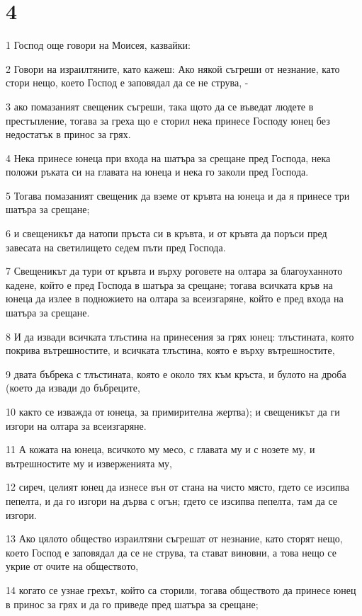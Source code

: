 \chapter{4}

\par 1 Господ още говори на Моисея, казвайки:
\par 2 Говори на израилтяните, като кажеш: Ако някой съгреши от незнание, като стори нещо, което Господ е заповядал да се не струва, -
\par 3 ако помазаният свещеник съгреши, така щото да се въведат людете в престъпление, тогава за греха що е сторил нека принесе Господу юнец без недостатък в принос за грях.
\par 4 Нека принесе юнеца при входа на шатъра за срещане пред Господа, нека положи ръката си на главата на юнеца и нека го заколи пред Господа.
\par 5 Тогава помазаният свещеник да вземе от кръвта на юнеца и да я принесе три шатъра за срещане;
\par 6 и свещеникът да натопи пръста си в кръвта, и от кръвта да поръси пред завесата на светилището седем пъти пред Господа.
\par 7 Свещеникът да тури от кръвта и върху роговете на олтара за благоуханното кадене, който е пред Господа в шатъра за срещане; тогава всичката кръв на юнеца да излее в подножието на олтара за всеизгаряне, който е пред входа на шатъра за срещане.
\par 8 И да извади всичката тлъстина на принесения за грях юнец: тлъстината, която покрива вътрешностите, и всичката тлъстина, която е върху вътрешностите,
\par 9 двата бъбрека с тлъстината, която е около тях към кръста, и булото на дроба (което да извади до бъбреците,
\par 10 както се изважда от юнеца, за примирителна жертва); и свещеникът да ги изгори на олтара за всеизгаряне.
\par 11 А кожата на юнеца, всичкото му месо, с главата му и с нозете му, и вътрешностите му и изверженията му,
\par 12 сиреч, целият юнец да изнесе вън от стана на чисто място, гдето се изсипва пепелта, и да го изгори на дърва с огън; гдето се изсипва пепелта, там да се изгори.
\par 13 Ако цялото общество израилтяни съгрешат от незнание, като сторят нещо, което Господ е заповядал да се не струва, та стават виновни, а това нещо се укрие от очите на обществото,
\par 14 когато се узнае грехът, който са сторили, тогава обществото да принесе юнец в принос за грях и да го приведе пред шатъра за срещане;
